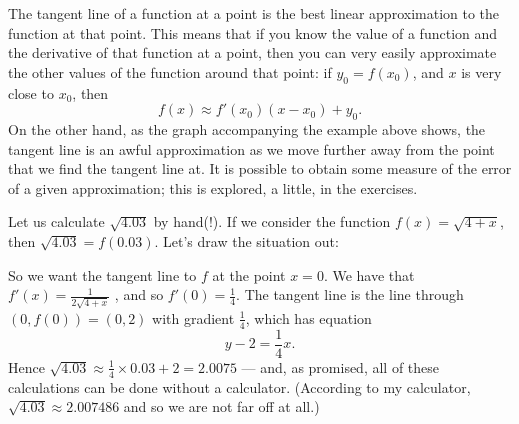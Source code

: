 The tangent line of a function at a point is the best linear approximation to the function at that point. This
means that if you know the value of a function and the derivative of that function at a point, then you can very
easily approximate the other values of the function around that point: if $ y_0 = f(x_0) $, and $ x $ is very
close to $ x_0 $, then
\begin{displaymath}
f(x) \approx f'(x_0)(x - x_0) + y_0.
\end{displaymath}
On the other hand, as the graph accompanying the example above shows, the tangent line is an awful approximation as
we move further away from the point that we find the tangent line at. It is possible to obtain some measure of the
error of a given approximation; this is explored, a little, in the exercises.

\begin{ex}
  Let us calculate $ \sqrt{4.03} $ by hand(!). If we consider the function $ f(x) = \sqrt{4 + x} $,
  then $ \sqrt{4.03} = f(0.03) $. Let's draw the situation out:
  \begin{center}
  \end{center}
  So we want the tangent line to $ f $ at the point $ x = 0 $. We have that $ f'(x) = \frac{1}{2\sqrt{4 + x}} $ ,
  and so $ f'(0) = \frac{1}{4} $. The tangent line is the line through $ (0, f(0)) = (0, 2) $ with gradient $ \frac{1}{4} $,
  which has equation
  \begin{displaymath}
    y - 2 = \frac{1}{4}x.
  \end{displaymath}
  Hence $ \sqrt{4.03} \approx \frac{1}{4} \times 0.03 + 2 = 2.0075 $ --- and, as promised, all of these calculations
  can be done without a calculator. (According to my calculator, $ \sqrt{4.03} \approx 2.007486 $ and so we are not far
  off at all.)


\end{ex}
